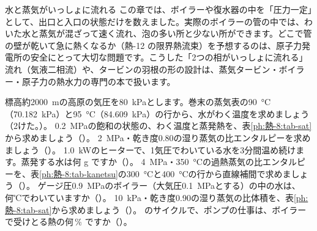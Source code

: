 \begin{phsaki}{水と蒸気がいっしょに流れる}
この章では、ボイラーや復水器の中を「圧力一定」として、出口と入口の状態だけを数えました。実際のボイラーの管の中では、わいた水と蒸気が混ざって速く流れ、泡の多い所と少ない所ができます。どこで管の壁が乾いて急に熱くなるか（熱-12 の限界熱流束）を予想するのは、原子力発電所の安全にとって大切な問題です。こうした「2つの相がいっしょに流れる」流れ（気液二相流）や、タービンの羽根の形の設計は、蒸気タービン・ボイラー・原子力の熱水力の専門の本で扱います。
\end{phsaki}

\bkendproblems
{}
\bkproblem 標高約\qty{2000}{m}の高原の気圧を\qty{80}{kPa}とします。巻末の蒸気表の\qty{90}{\celsius}（\qty{70.182}{kPa}）と\qty{95}{\celsius}（\qty{84.609}{kPa}）の行から、水がわく温度を求めましょう（2けた。）。
\bkproblem \qty{0.2}{MPa}の飽和の状態の、わく温度と蒸発熱を、表\ref{ph:熱-8:tab-sat}から求めましょう（）。
\bkproblem \qty{2}{MPa}・乾き度0.80の湿り蒸気の比エンタルピーを求めましょう（）。
\bkproblem \qty{1.0}{kW}のヒーターで、1気圧でわいている水を3分間温め続けます。蒸発する水は何 g ですか（）。
\bkproblem \qty{4}{MPa}・\qty{350}{\celsius}の過熱蒸気の比エンタルピーを、表\ref{ph:熱-8:tab-kanetsu}の\qty{300}{\celsius}と\qty{400}{\celsius}の行から直線補間で求めましょう（）。
\bkproblem ゲージ圧\qty{0.9}{MPa}のボイラー（大気圧\qty{0.1}{MPa}とする）の中の水は、何℃でわいていますか（）。
\bkproblem \qty{10}{kPa}・乾き度0.90の湿り蒸気の比体積を、表\ref{ph:熱-8:tab-sat}から求めましょう（）。
\bkproblem {}のサイクルで、ポンプの仕事は、ボイラーで受けとる熱の何\,\% ですか（）。
